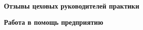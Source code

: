 \begin{center}
\bfseries{\large Отзывы цеховых руководителей практики}
\end{center}

\vspace{250pt}

\begin{center}
\bfseries{\large Работа в помощь предприятию}
\end{center}

\pagebreak
